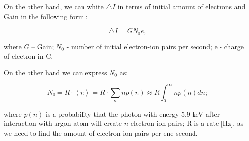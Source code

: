 \documentclass[12pt,a4paper]{article}
\def\mean#1{\left< #1 \right>}
\begin{document}
	On the other hand, we can white $\bigtriangleup I$ in terms of initial amount of electrons and Gain in the following form :
	
	
	
	
	
	
	
	\begin{equation}
	\bigtriangleup I = G N_0 e,
	\label{eq:IGainN0}
	\end{equation}
	
	where $G$ -- Gain; $N_0$ - number of initial electron-ion pairs per second; e - charge of electron in C.
	
	On the other hand we can express $N_0$ as:
	
	\begin{equation}
	N_0 = R \cdot \mean{n} = R \cdot\sum_n n p(n) \approx R \int_0^\infty n p(n) dn;
	\end{equation}

	where  $p(n)$ is a probability that the photon with energy 5.9 keV after interaction with argon atom will create $n$ electron-ion pairs; R is a rate [Hz], as we need to find the amount of electron-ion pairs per one second.
\end{document}

